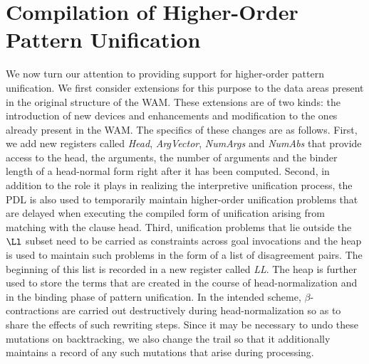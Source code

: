 \section{Compilation of Higher-Order Pattern Unification}\label{sec:ho_unif}
We now turn our attention to providing support for higher-order
pattern unification. We first consider extensions for this purpose to
the data areas present in the original structure of the WAM.
These extensions are of two kinds: the introduction of new devices and
enhancements and modification to the ones already present in the WAM.
The specifics of these changes are as follows. First, we add new
registers called {\it Head}, {\it
  ArgVector}, {\it NumArgs} and {\it NumAbs} that provide access to
the head, the arguments, the number of arguments and the binder length
of a head-normal form right after it has been computed.
Second, in addition to the role it plays in realizing the interpretive
unification process,
the PDL is also used to temporarily maintain higher-order unification
problems that are delayed when executing the compiled form of
unification arising from matching with the clause head.
Third, unification problems that lie outside the $\Ll$ subset need to
be carried as constraints across goal invocations and the heap is used
to maintain such problems in the form of a list of disagreement
pairs. The beginning of this list is recorded in a new register called
{\it LL}.
The heap is further used to store the terms that are created in the
course of head-normalization and in the binding phase of pattern
unification.
In the intended scheme, $\beta$-contractions are carried out
destructively during head-normalization so as to share
the effects of such rewriting steps. Since it may be necessary to undo
these mutations on backtracking, we also change the trail so that it
additionally maintains a record of any such mutations that arise
during processing.

